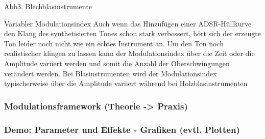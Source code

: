 Abb3. Blechblasinstrumente 


Variabler Modulationsindex
Auch wenn das Hinzufügen einer ADSR-Hüllkurve den Klang des synthetisierten Tones schon stark verbessert, hört sich der erzeugte Ton leider noch nicht wie ein echtes Instrument an. Um den Ton noch realistischer klingen zu lassen kann der Modulationsindex über die Zeit oder die Amplitude variiert werden und somit die Anzahl der Oberschwingungen verändert werden. Bei Blasinstrumenten wird der Modulationsindex typischerweise über die Amplitude variiert während bei Holzblasinstrumenten 



\subsubsection{Modulationsframework (Theorie -> Praxis)}
\subsubsection{Demo: Parameter und Effekte - Grafiken (evtl. Plotten)}